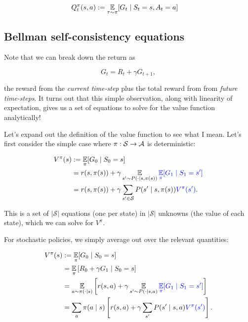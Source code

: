 \documentclass[../main/main]{subfiles}
\begin{document}
\begin{align*}
    Q_t^\pi(s, a) &:= \E_{\tau \sim \pi} [G_t \mid S_t = s, A_t = a] %
\end{align*}

\subsection{Bellman self-consistency equations}

Note that we can break down the return as

\[
    G_t = R_t + \gamma G_{t+1},
\]

the reward from the \emph{current time-step} plus the total reward from from \emph{future time-steps}. It turns out that this simple observation, along with linearity of expectation, gives us a set of equations to solve for the value function analytically!

Let's expand out the definition of the value function to see what I mean. Let's first consider the simple case where $\pi : \mathcal{S} \to \mathcal{A}$ is deterministic:

\begin{align*}
    V^\pi(s) &:= \operatorname*{\mathbb{E}}_\pi[G_0 \mid S_0 = s] \\
    &= r(s, \pi(s)) + \gamma \operatorname*{\mathbb{E}}_{s' \sim P(\cdot \mid s, \pi(s))} {\color{blue} \operatorname*{\mathbb{E}}_\pi [G_1 \mid S_1 = s']} \\
    &= r(s, \pi(s)) + \gamma \sum_{s' \in \mathcal{S}} P(s' \mid s, \pi(s)) {\color{blue} V^\pi(s')}.
\end{align*}

This is a set of $|\mathcal{S}|$ equations (one per state) in $|\mathcal{S}|$ unknowns (the value of each state), which we can solve for $V^\pi$.

For stochastic policies, we simply average out over the relevant quantities:

\begin{align*}
    V^\pi(s) &:= \operatorname*{\mathbb{E}}_\pi [G_0 \mid S_0 = s] \\
    &= \operatorname*{\mathbb{E}}_\pi \left[ R_0 + \gamma G_1 \mid S_0 = s \right] \\
    &= \operatorname*{\mathbb{E}}_{a \sim \pi(\cdot \mid s)} \left[ r(s, a) + \gamma \operatorname*{\mathbb{E}}_{s' \sim P(\cdot \mid s, a)}  {\color{blue} \operatorname*{\mathbb{E}}_\pi [G_1 \mid S_1 = s']} \right] \\
    &= \sum_a \pi(a \mid s) \left[r(s, a) + \gamma \sum_{s'} P(s' \mid s, a) {\color{blue} V^\pi(s')} \right].
\end{align*}
\end{document}
